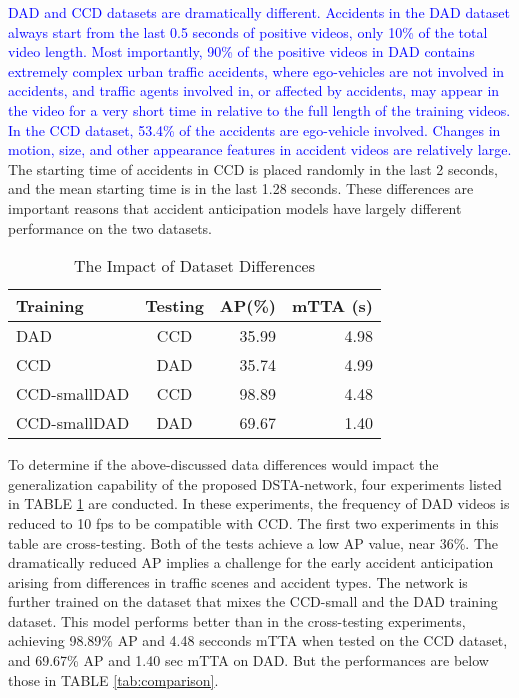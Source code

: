 \documentclass[journal]{IEEEtran}
\begin{document}
\textcolor{blue}{DAD and CCD datasets are dramatically different. Accidents in the DAD dataset always start from the last 0.5 seconds of positive videos, only 10\% of the total video length. Most importantly, 90\% of the positive videos in DAD contains extremely complex urban traffic accidents, where ego-vehicles are not involved in accidents, and traffic agents involved in, or affected by accidents, may appear in the video for a very short time in relative to the full length of the training videos. In the CCD dataset, 53.4\% of the accidents are ego-vehicle involved. Changes in motion, size, and other appearance features in accident videos are relatively large.} The starting time of accidents in CCD is placed randomly in the last 2 seconds, and the mean starting time is in the last 1.28 seconds. These differences are important reasons that accident anticipation models have largely different performance on the two datasets. 
\begin{table}[htbp]
\renewcommand{\arraystretch}{1.3}
    \caption{The Impact of Dataset Differences}
    \label{tab:impact_dataset}
    \centering
    \begin{tabular}{l|c|r|r}
        \hline
         Training & Testing &AP(\%) & mTTA (s)  \\
         \hline
         DAD & CCD & 35.99 & 4.98 \\
         CCD & DAD & 35.74 & 4.99 \\
         CCD-smallDAD&CCD&{98.89}&{4.48}\\
         CCD-smallDAD&DAD&{69.67}&{1.40}\\
         \hline
    \end{tabular}
\end{table}
To determine if the above-discussed data differences would impact the generalization capability of the proposed DSTA-network, four experiments listed in TABLE \ref{tab:impact_dataset} are conducted. In these experiments, the frequency of DAD videos is reduced to 10 fps to be compatible with CCD. The first two experiments in this table are cross-testing. Both of the tests achieve a low AP value, near 36\%. The dramatically reduced AP implies a challenge for the early accident anticipation arising from differences in traffic scenes and accident types. The network is further trained on the dataset that mixes the CCD-small and the DAD training dataset. This model performs better than in the cross-testing experiments, achieving 98.89\% AP and 4.48 secconds mTTA when tested on the CCD dataset, and 69.67\% AP and 1.40 sec mTTA on DAD. But the performances are below those in TABLE \ref{tab:comparison}.
\end{document}
